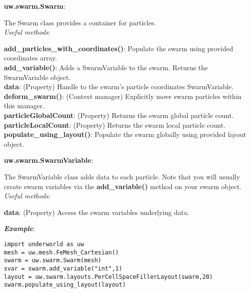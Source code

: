 \documentclass[10pt,landscape]{article}
\begin{document}
\begin{multicols}{2}
\noindent\textbf{uw.swarm.Swarm}:
\begin{addmargin}[1em]{2em}
The Swarm class provides a container for particles.\\
\vspace{1mm}
\textit{Useful methods}:\\
\begin{addmargin}[1em]{2em}
\textbf{add\_particles\_with\_coordinates()}: Populate the swarm using provided coordinates array.\\
\textbf{add\_variable()}: Adds a SwarmVariable to the swarm. Returns the SwarmVariable object.\\
\textbf{data}: (Property) Handle to the swarm's particle coordinates SwarmVariable.\\
\textbf{deform\_swarm()}: (Context manager) Explicitly move swarm particles within this manager.\\
\textbf{particleGlobalCount}: (Property) Returns the swarm global particle count.\\
\textbf{particleLocalCount}: (Property) Returns the swarm local particle count.\\
\textbf{populate\_using\_layout()}: Populate the swarm globally using provided layout object.\\
\end{addmargin}
\end{addmargin}
\vspace{2mm}
\noindent\textbf{uw.swarm.SwarmVariable}:
\begin{addmargin}[1em]{2em}
The SwarmVariable class adds data to each particle. Note that you will usually create swarm
variables via the \textbf{add\_variable()} method on your swarm object.\\
\vspace{1mm}
\textit{Useful methods}:\\
\begin{addmargin}[1em]{2em}
\textbf{data}: (Property) Access the swarm variables underlying data.\\
\end{addmargin}
\end{addmargin}

\vspace{2mm}
\noindent\textbf{\textit{Example}}:
\begin{lstlisting}
import underworld as uw
mesh = uw.mesh.FeMesh_Cartesian()
swarm = uw.swarm.Swarm(mesh)
svar = swarm.add_variable("int",1)
layout = uw.swarm.layouts.PerCellSpaceFillerLayout(swarm,20)
swarm.populate_using_layout(layout)
\end{lstlisting}



\end{multicols}
\end{document}
